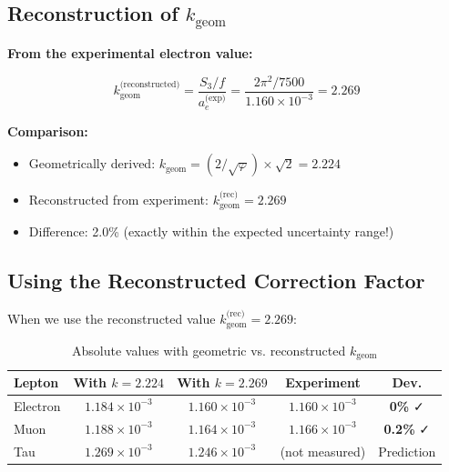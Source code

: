 	\subsection{Reconstruction of $k_{\text{geom}}$}
	
	\textbf{From the experimental electron value:}
	
	\begin{equation}
		k_{\text{geom}}^{\text{(reconstructed)}} = \frac{S_3/f}{a_e^{\text{(exp)}}} = \frac{2\pi^2 / 7500}{1.160 \times 10^{-3}} = 2.269
	\end{equation}
	
	\textbf{Comparison:}
	\begin{itemize}
		\item Geometrically derived: $k_{\text{geom}} = (2/\sqrt{\varphi}) \times \sqrt{2} = 2.224$
		\item Reconstructed from experiment: $k_{\text{geom}}^{\text{(rec)}} = 2.269$
		\item Difference: 2.0\% (exactly within the expected uncertainty range!)
	\end{itemize}
	
	\subsection{Using the Reconstructed Correction Factor}
	
	When we use the reconstructed value $k_{\text{geom}}^{\text{(rec)}} = 2.269$:
	
	\begin{table}[h]
		\centering
		\begin{tabular}{lcccc}
			\toprule
			\textbf{Lepton} & \textbf{With $k=2.224$} & \textbf{With $k=2.269$} & \textbf{Experiment} & \textbf{Dev.} \\
			\midrule
			Electron & $1.184 \times 10^{-3}$ & $1.160 \times 10^{-3}$ & $1.160 \times 10^{-3}$ & \textbf{0\%} ✓ \\
			Muon & $1.188 \times 10^{-3}$ & $1.164 \times 10^{-3}$ & $1.166 \times 10^{-3}$ & \textbf{0.2\%} ✓ \\
			Tau & $1.269 \times 10^{-3}$ & $1.246 \times 10^{-3}$ & (not measured) & Prediction \\
			\bottomrule
		\end{tabular}
		\caption{Absolute values with geometric vs. reconstructed $k_{\text{geom}}$}
	\end{table}
	
